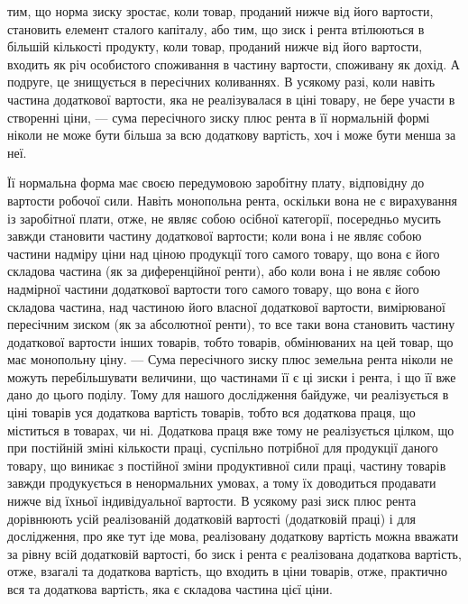 \parcont{}  %
тим, що норма зиску зростає, коли товар, проданий нижче від його вартости,
становить елемент сталого капіталу, або тим, що зиск і рента втілюються
в більшій кількості продукту, коли товар, проданий нижче від його вартости,
входить як річ особистого споживання в частину вартости, споживану як дохід.
А подруге, це знищується в пересічних коливаннях. В усякому разі, коли навіть
частина додаткової вартости, яка не реалізувалася в ціні товару, не бере участи
в створенні ціни, — сума пересічного зиску плюс рента в її нормальній формі
ніколи не може бути більша за всю додаткову вартість, хоч і може бути
менша за неї.

Її нормальна форма має своєю передумовою заробітну плату, відповідну
до вартости робочої сили. Навіть монопольна рента, оскільки вона не є вирахування
із заробітної плати, отже, не являє собою осібної категорії, посередньо
мусить завжди становити частину додаткової вартости; коли вона і не являє
собою частини надміру ціни над ціною продукції того самого товару, що вона
є його складова частина (як за диференційної ренти), або коли вона і не являє
собою надмірної частини додаткової вартости того самого товару, що вона є його
складова частина, над частиною його власної додаткової вартости, вимірюваної
пересічним зиском (як за абсолютної ренти), то все таки вона становить частину
додаткової вартости інших товарів, тобто товарів, обмінюваних на цей товар,
що має монопольну ціну. — Сума пересічного зиску плюс земельна рента ніколи
не можуть перебільшувати величини, що частинами її є ці зиски і рента, і що її
вже дано до цього поділу. Тому для нашого дослідження байдуже, чи реалізується
в ціні товарів уся додаткова вартість товарів, тобто вся додаткова праця,
що міститься в товарах, чи ні. Додаткова праця вже тому не реалізується цілком,
що при постійній зміні кількости праці, суспільно потрібної для продукції даного
товару, що виникає з постійної зміни продуктивної сили праці, частину
товарів завжди продукується в ненормальних умовах, а тому їх доводиться
продавати нижче від їхньої індивідуальної вартости. В усякому разі зиск
плюс рента дорівнюють усій реалізованій додатковій вартості (додатковій праці)
і для дослідження, про яке тут іде мова, реалізовану додаткову вартість можна
вважати за рівну всій додатковій вартості, бо зиск і рента є реалізована додаткова
вартість, отже, взагалі та додаткова вартість, що входить в ціни товарів,
отже, практично вся та додаткова вартість, яка є складова частина цієї ціни.

